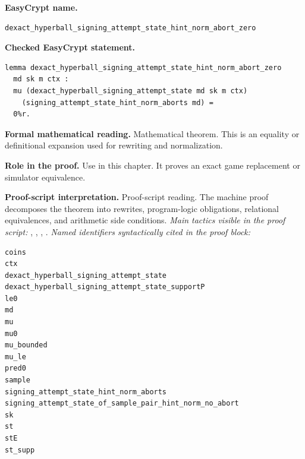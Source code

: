 \begin{formaltheorem}
\noindent\textbf{EasyCrypt name.}
\begin{lstlisting}[language=EasyCrypt,basicstyle=\ttfamily\scriptsize]
dexact_hyperball_signing_attempt_state_hint_norm_abort_zero
\end{lstlisting}
\noindent\textbf{Checked EasyCrypt statement.}
\begin{lstlisting}[language=EasyCrypt,basicstyle=\ttfamily\scriptsize]
lemma dexact_hyperball_signing_attempt_state_hint_norm_abort_zero
  md sk m ctx :
  mu (dexact_hyperball_signing_attempt_state md sk m ctx)
    (signing_attempt_state_hint_norm_aborts md) =
  0%r.
\end{lstlisting}
\noindent\textbf{Formal mathematical reading.}
Mathematical theorem. This is an equality or definitional expansion used for rewriting and normalization.

\noindent\textbf{Role in the proof.}
Use in this chapter. It proves an exact game replacement or simulator equivalence.

\noindent\textbf{Proof-script interpretation.}
Proof-script reading. The machine proof decomposes the theorem into rewrites, program-logic obligations, relational equivalences, and arithmetic side conditions.
\emph{Main tactics visible in the proof script:} , , , .
\emph{Named identifiers syntactically cited in the proof block:}
\begin{lstlisting}[language=EasyCrypt,basicstyle=\ttfamily\scriptsize]
coins
ctx
dexact_hyperball_signing_attempt_state
dexact_hyperball_signing_attempt_state_supportP
le0
md
mu
mu0
mu_bounded
mu_le
pred0
sample
signing_attempt_state_hint_norm_aborts
signing_attempt_state_of_sample_pair_hint_norm_no_abort
sk
st
stE
st_supp
\end{lstlisting}

\end{formaltheorem}

